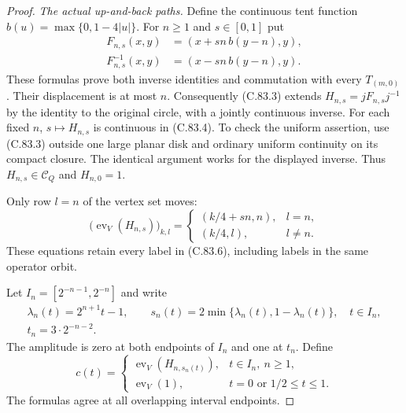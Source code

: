 \begin{proof}
\emph{The actual up-and-back paths.}
Define the continuous tent function
$b(u)=\max\{0,1-4|u|\}$.
For $n\geq1$ and $s\in[0,1]$ put
\[
 \begin{split}
 F_{n,s}(x,y)&=(x+sn\,b(y-n),y),\\
 F_{n,s}^{-1}(x,y)&=(x-sn\,b(y-n),y).
 \end{split}                                                    \tag{C.83.7}
\]
These formulas prove both inverse identities
and commutation with every $T_{(m,0)}$.
Their displacement is at most $n$.
Consequently (C.83.3) extends
$H_{n,s}=jF_{n,s}j^{-1}$ by the identity
to the original circle, with a jointly
continuous inverse. For each fixed $n$,
$s\mapsto H_{n,s}$ is continuous in
(C.83.4). To check the uniform assertion,
use (C.83.3) outside one large planar disk
and ordinary uniform continuity on its
compact closure. The identical argument
works for the displayed inverse.
Thus $H_{n,s}\in\mathscr C_Q$ and
$H_{n,0}=1$.

Only row $l=n$ of the vertex set moves:
\[
 \bigl(\operatorname{ev}_V(H_{n,s})\bigr)_{k,l}
  =
  \begin{cases}
     (k/4+sn,n),&l=n,\\
     (k/4,l),&l\ne n.
  \end{cases}                                                    \tag{C.83.8}
\]
These equations retain every label in
(C.83.6), including labels in the same
operator orbit.

Let $I_n=[2^{-n-1},2^{-n}]$ and write
\[
 \begin{gathered}
 \lambda_n(t)=2^{n+1}t-1,\qquad
 s_n(t)=2\min\{\lambda_n(t),1-\lambda_n(t)\},
       \quad t\in I_n,\\
 t_n=3\cdot2^{-n-2}.
 \end{gathered}                                                  \tag{C.83.9}
\]
The amplitude is zero at both endpoints
of $I_n$ and one at $t_n$.
Define
\[
 c(t)=
 \begin{cases}
  \operatorname{ev}_V(H_{n,s_n(t)}),&t\in I_n,\ n\geq1,\\
  \operatorname{ev}_V(1),&t=0\text{ or }1/2\leq t\leq1.
 \end{cases}                                                    \tag{C.83.10}
\]
The formulas agree at all overlapping
interval endpoints.


\end{proof}
